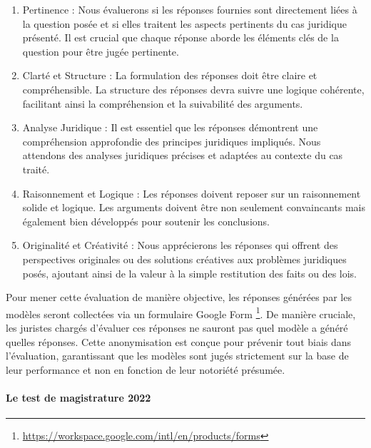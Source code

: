 \begin{enumerate}
    \item Pertinence : Nous évaluerons si les réponses fournies sont directement liées à la question posée et si elles traitent les aspects pertinents du cas juridique présenté. Il est crucial que chaque réponse aborde les éléments clés de la question pour être jugée pertinente.

    \item Clarté et Structure : La formulation des réponses doit être claire et compréhensible. La structure des réponses devra suivre une logique cohérente, facilitant ainsi la compréhension et la suivabilité des arguments.

    \item Analyse Juridique : Il est essentiel que les réponses démontrent une compréhension approfondie des principes juridiques impliqués. Nous attendons des analyses juridiques précises et adaptées au contexte du cas traité.

    \item Raisonnement et Logique : Les réponses doivent reposer sur un raisonnement solide et logique. Les arguments doivent être non seulement convaincants mais également bien développés pour soutenir les conclusions.

    \item Originalité et Créativité : Nous apprécierons les réponses qui offrent des perspectives originales ou des solutions créatives aux problèmes juridiques posés, ajoutant ainsi de la valeur à la simple restitution des faits ou des lois.
\end{enumerate}

Pour mener cette évaluation de manière objective, les réponses générées par les modèles seront collectées via un formulaire Google Form \footnote{\href{https://workspace.google.com/intl/en/products/forms}{https://workspace.google.com/intl/en/products/forms}}. De manière cruciale, les juristes chargés d'évaluer ces réponses ne sauront pas quel modèle a généré quelles réponses. Cette anonymisation est conçue pour prévenir tout biais dans l'évaluation, garantissant que les modèles sont jugés strictement sur la base de leur performance et non en fonction de leur notoriété présumée. 

\paragraph{Le test de magistrature 2022} \hspace{0pt}

